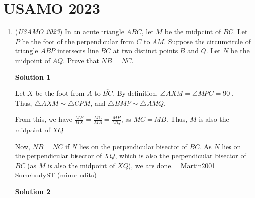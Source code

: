 \section{USAMO 2023}
        \begin{enumerate}
        	\item (\textit{USAMO 2023}) In an acute triangle $ABC$, let $M$ be the midpoint of $\overline{BC}$. Let $P$ be the foot of the perpendicular from $C$ to $AM$. Suppose the circumcircle of triangle $ABP$ intersects line $BC$ at two distinct points $B$ and $Q$. Let $N$ be the midpoint of $\overline{AQ}$. Prove that $NB=NC$.


 



\textbf{Solution 1}

Let $X$ be the foot from $A$ to $\overline{BC}$. By definition, $\angle AXM = \angle MPC = 90^{\circ}$. Thus, $\triangle AXM \sim \triangle CPM$, and $\triangle BMP \sim \triangle AMQ$. 

 From this, we have $\frac{MP}{MX} = \frac{MC}{MA} = \frac{MP}{MQ}$, as $MC=MB$. Thus, $M$ is also the midpoint of $XQ$.

 Now, $NB = NC$ if $N$ lies on the perpendicular bisector of $\overline{BC}$. As $N$ lies on the perpendicular bisector of $\overline{XQ}$, which is also the perpendicular bisector of $\overline{BC}$ (as $M$ is also the midpoint of $XQ$), we are done. ~ Martin2001~ SomebodyST (minor edits)

 



\textbf{Solution 2}


\end{enumerate}

